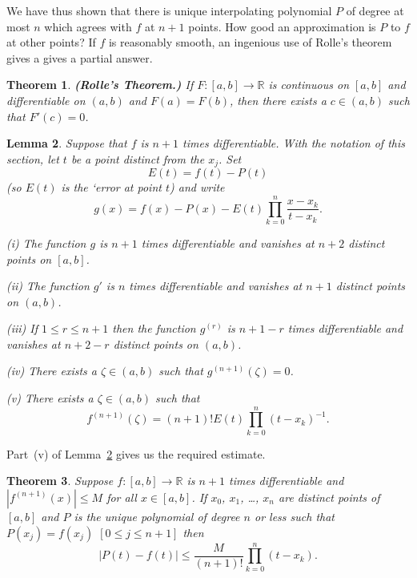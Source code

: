 \documentclass[12pt]{article}
\newtheorem{theorem}{Theorem}[section]
\newtheorem{lemma}[theorem]{Lemma}
\theoremstyle{definition}
\begin{document}
We have thus shown that there is unique interpolating polynomial $P$
of degree at most $n$ which agrees with $f$ at $n+1$ points.
How good an approximation is $P$ to $f$ at other points?
If $f$ is reasonably smooth, an ingenious use of Rolle's
theorem gives a gives a partial answer.
\begin{theorem}{\bf (Rolle's Theorem.)} If
$F:[a,b]\rightarrow{\mathbb R}$ is continuous on $[a,b]$
and differentiable on $(a,b)$ 
and $F(a)=F(b)$, then there exists a $c\in(a,b)$
such that $F'(c)=0$.
\end{theorem}
\begin{lemma}\label{L, start interpolation error} 
Suppose that $f$ is $n+1$ times differentiable. 
With the notation of this section, let
$t$ be a point distinct from the $x_{j}$. Set
\[E(t)=f(t)-P(t)\]
(so $E(t)$ is the `error at point $t$) and write
\[g(x)=f(x)-P(x)-E(t)
\prod_{k=0}^{n}\frac{x-x_{k}}{t-x_{k}}.\]

(i) The function $g$ is $n+1$ times differentiable and
vanishes at $n+2$ distinct points on $[a,b]$.

(ii) The function $g'$ is $n$ times differentiable and 
vanishes at $n+1$ distinct points on $(a,b)$.

(iii) If $1\leq r\leq n+1$ then
the function $g^{(r)}$ is $n+1-r$ times differentiable and 
vanishes at $n+2-r$ distinct points on $(a,b)$.

(iv) There exists a $\zeta\in(a,b)$ such that
$g^{(n+1)}(\zeta)=0$.

(v) There exists a $\zeta\in(a,b)$ such that
\[f^{(n+1)}(\zeta)=(n+1)!E(t)\prod_{k=0}^{n}(t-x_{k})^{-1}.\]
\end{lemma}
Part~(v) of Lemma~\ref{L, start interpolation error}
gives us the required estimate.
\begin{theorem}\label{T, interpolation error}  
Suppose $f:[a,b]\rightarrow{\mathbb R}$
is $n+1$ times differentiable and $|f^{(n+1)}(x)|\leq M$
for all $x\in[a,b]$. If $x_{0}$, $x_{1}$, \dots, $x_{n}$
are distinct points of $[a,b]$ and $P$ is the unique polynomial
of degree $n$ or less such that $P(x_{j})=f(x_{j})$
$[0\leq j\leq n+1]$ then
\[|P(t)-f(t)|\leq \frac{M}{(n+1)!}\prod_{k=0}^{n}(t-x_{k}).\]
\end{theorem}
\end{document}
